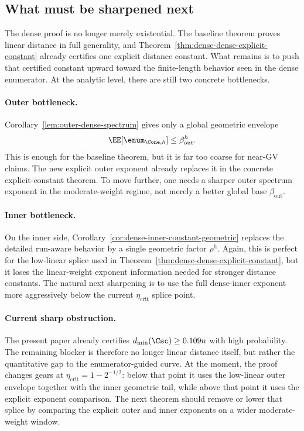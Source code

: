 \subsection{What must be sharpened next}
\label{sec:integration-dense-dense-block}

The dense proof is no longer merely existential.
The baseline theorem proves linear distance in full generality, and
Theorem~\ref{thm:dense-dense-explicit-constant} already certifies one explicit distance constant.
What remains is to push that certified constant upward toward the finite-length behavior seen in the dense enumerator.
At the analytic level, there are still two concrete bottlenecks.

\paragraph{Outer bottleneck.}
Corollary~\ref{lem:outer-dense-spectrum} gives only a global geometric envelope
\[
\EE[\enum_{\Cone,h}] \le \beta_{\mathrm{out}}^h.
\]
This is enough for the baseline theorem, but it is far too coarse for near-GV claims.
The new explicit outer exponent already replaces it in the concrete explicit-constant theorem.
To move further, one needs a sharper outer spectrum exponent in the moderate-weight regime,
not merely a better global base \(\beta_{\mathrm{out}}\).

\paragraph{Inner bottleneck.}
On the inner side, Corollary~\ref{cor:dense-inner-constant-geometric} replaces the detailed run-aware behavior by a
single geometric factor \(\rho^h\).
Again, this is perfect for the low-linear splice used in Theorem~\ref{thm:dense-dense-explicit-constant},
but it loses the linear-weight exponent information needed for stronger distance constants.
The natural next sharpening is to use the full dense-inner exponent more aggressively below the current
\(\eta_{\mathrm{crit}}\) splice point.

\paragraph{Current sharp obstruction.}
The present paper already certifies \(d_{\min}(\Csc)\ge 0.109n\) with high probability.
The remaining blocker is therefore no longer linear distance itself, but rather the quantitative gap to the
enumerator-guided curve.
At the moment, the proof changes gears at \(\eta_{\mathrm{crit}}=1-2^{-1/2}\):
below that point it uses the low-linear outer envelope together with the inner geometric tail, while above that point
it uses the explicit exponent comparison.
The next theorem should remove or lower that splice by comparing the explicit outer and inner exponents on a wider
moderate-weight window.

